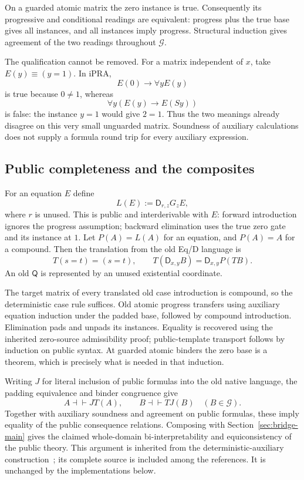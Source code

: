 \documentclass[11pt,letterpaper]{article}
\theoremstyle{definition}\newtheorem{definition}[theorem]{Definition}
\theoremstyle{remark}\newtheorem{remark}[theorem]{Remark}
\newcommand{\D}{\mathsf D}
\newcommand{\Q}{\mathsf Q}
\newcommand{\G}{\mathcal G}
\begin{document}
On a guarded atomic matrix the zero instance is true. Consequently its
progressive and conditional readings are equivalent: progress plus the
true base gives all instances, and all instances imply progress.
Structural induction gives agreement of the two readings throughout
$\G$.

The qualification cannot be removed. For a matrix independent of $x$,
take $E(y)\equiv(y=1)$. In iPRA,
\[
 E(0)\to\forall yE(y)
\]
is true because $0\ne1$, whereas
\[
 \forall y(E(y)\to E(Sy))
\]
is false: the instance $y=1$ would give $2=1$. Thus the two meanings
already disagree on this very small unguarded matrix. Soundness of
auxiliary calculations does not supply a formula round trip for every
auxiliary expression.

\subsection{Public completeness and the composites}

For an equation $E$ define
\[
 L(E):=\D_{r,z}G_zE,
\]
where $r$ is unused. This is public and interderivable with $E$:
forward introduction ignores the progress assumption; backward
elimination uses the true zero gate and its instance at $1$.
Let $P(A)=L(A)$ for an equation, and $P(A)=A$ for a compound.
Then the translation from the old Eq/D language is
\[
 T(s=t)=(s=t),\qquad
 T(\D_{x,y}B)=\D_{x,y}P(TB).
\]
An old $\Q$ is represented by an unused existential coordinate.

The target matrix of every translated old case introduction is compound,
so the deterministic case rule suffices. Old atomic progress transfers
using auxiliary equation induction under the padded base, followed by
compound introduction. Elimination pads and unpads its instances.
Equality is recovered using the inherited zero-source admissibility
proof; public-template transport follows by induction on public syntax.
At guarded atomic binders the zero base is a theorem, which is precisely
what is needed in that induction.

Writing $J$ for literal inclusion of public formulas into the old native
language, the padding equivalence and binder congruence give
\[
 A\dashv\vdash JT(A),\qquad
 B\dashv\vdash TJ(B)\quad(B\in\G).
\]
Together with auxiliary soundness and agreement on public formulas,
these imply equality of the public consequence relations. Composing
with Section~\ref{sec:bridge-main} gives the claimed whole-domain
bi-interpretability and equiconsistency of the public theory.
This argument is inherited from the deterministic-auxiliary
construction~\cite{auxiliary}; its complete source is included among
the references. It is unchanged by the implementations below.
\end{document}
